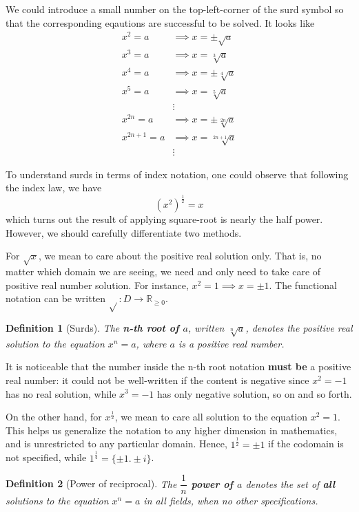\documentclass[12pt]{article}
\newtheorem{definition}{Definition}[section]
\begin{document}
    We could introduce a small number on the top-left-corner of the surd symbol so that the corresponding eqautions are successful to be solved. It looks like \begin{align*}
        x^2=a &\implies x=\pm\sqrt{a}\\
        x^3=a &\implies x=\sqrt[3]{a}\\
        x^4=a &\implies x=\pm\sqrt[4]{a}\\
        x^5=a &\implies x=\sqrt[5]{a}\\ 
        &\vdots\\
        x^{2n}=a &\implies x=\pm\sqrt[2n]{a}\\
        x^{2n+1}=a &\implies x=\sqrt[2n+1]{a}\\
        &\vdots 
    \end{align*}

    To understand surds in terms of index notation, one could observe that following the index law, we have $$(x^2)^{\frac{1}{2}}=x$$ which turns out the result of applying square-root is nearly the half power. However, we should carefully differentiate two methods.

    For $\sqrt{x}$, we mean to care about the positive real solution only. That is, no matter which domain we are seeing, we need and only need to take care of positive real number solution. For instance, $x^2=1\implies x=\pm 1$. The functional notation can be written $\sqrt{}:D\to\mathbb{R}_{\geq 0}$.

    \begin{definition}[Surds]
        The \textbf{n-th root of $a$}, written $\sqrt[n]{a}$, denotes the positive real solution to the equation $x^n=a$, where $a$ is a positive real number.
    \end{definition}

    It is noticeable that the number inside the n-th root notation \textbf{must be} a positive real number: it could not be well-written if the content is negative since $x^2=-1$ has no real solution, while $x^3=-1$ has only negative solution, so on and so forth.

    On the other hand, for $x^{\frac{1}{2}}$, we mean to care all solution to the equation $x^2=1$. This helps us generalize the notation to any higher dimension in mathematics, and is unrestricted to any particular domain. Hence, $1^{\frac{1}{2}}=\pm 1$ if the codomain is not specified, while $1^{\frac{1}{4}}=\{\pm 1. \pm i\}$.

    \begin{definition}[Power of reciprocal]
        The \textbf{$\dfrac{1}{n}$ power of $a$} denotes the set of \textbf{all} solutions to the equation $x^n=a$ in all fields, when no other specifications.
    \end{definition}
\end{document}
